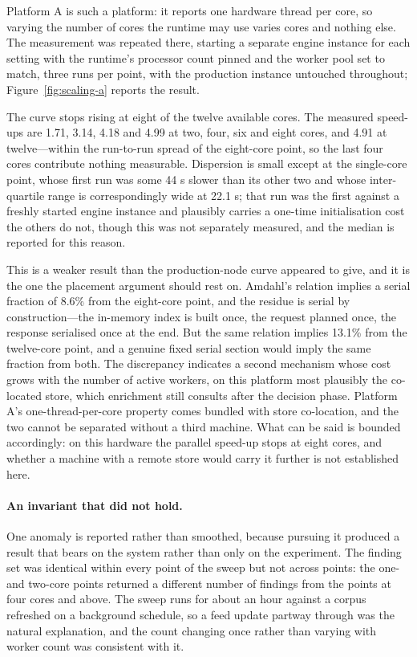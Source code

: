 \documentclass[fleqn,10pt,lineno]{wlpeerj}
\begin{document}
Platform A is such a platform: it reports one hardware thread per core, so varying the number of cores the runtime may use varies cores and nothing else. The measurement was repeated there, starting a separate engine instance for each setting with the runtime's processor count pinned and the worker pool set to match, three runs per point, with the production instance untouched throughout; Figure~\ref{fig:scaling-a} reports the result.

The curve stops rising at eight of the twelve available cores. The measured speed-ups are 1.71, 3.14, 4.18 and 4.99 at two, four, six and eight cores, and 4.91 at twelve---within the run-to-run spread of the eight-core point, so the last four cores contribute nothing measurable. Dispersion is small except at the single-core point, whose first run was some 44 s slower than its other two and whose inter-quartile range is correspondingly wide at 22.1 s; that run was the first against a freshly started engine instance and plausibly carries a one-time initialisation cost the others do not, though this was not separately measured, and the median is reported for this reason.

This is a weaker result than the production-node curve appeared to give, and it is the one the placement argument should rest on. Amdahl's relation \cite{amdahl1967} implies a serial fraction of 8.6\% from the eight-core point, and the residue is serial by construction---the in-memory index is built once, the request planned once, the response serialised once at the end. But the same relation implies 13.1\% from the twelve-core point, and a genuine fixed serial section would imply the same fraction from both. The discrepancy indicates a second mechanism whose cost grows with the number of active workers, on this platform most plausibly the co-located store, which enrichment still consults after the decision phase. Platform A's one-thread-per-core property comes bundled with store co-location, and the two cannot be separated without a third machine. What can be said is bounded accordingly: on this hardware the parallel speed-up stops at eight cores, and whether a machine with a remote store would carry it further is not established here.

\paragraph{An invariant that did not hold.}
One anomaly is reported rather than smoothed, because pursuing it produced a result that bears on the system rather than only on the experiment. The finding set was identical within every point of the sweep but not across points: the one- and two-core points returned a different number of findings from the points at four cores and above. The sweep runs for about an hour against a corpus refreshed on a background schedule, so a feed update partway through was the natural explanation, and the count changing once rather than varying with worker count was consistent with it.
\end{document}
